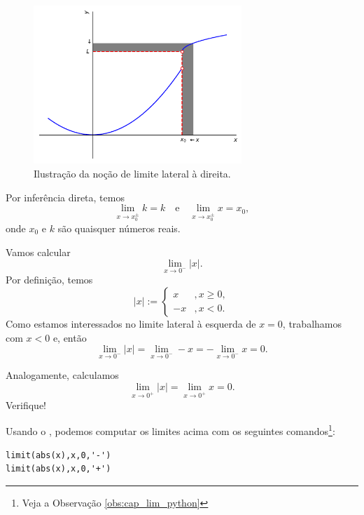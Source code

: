 \begin{figure}[H]
  \centering
  \includegraphics[width=0.7\textwidth]{./cap_lim/dados/fig_lim_dir/fig_lim_dir}
  \caption{Ilustração da noção de limite lateral à direita.}
  \label{fig:lim_dir}
\end{figure}

\begin{obs}
  Por inferência direta, temos
  \begin{equation}
    \lim_{x\to x_0^{\pm}} k = k\quad\text{e}\quad\lim_{x\to x_0^{\pm}} x = x_0,
  \end{equation}
  onde $x_0$ e $k$ são quaisquer números reais.
\end{obs}

\begin{exer}\label{ex:lim_absx}
  Vamos calcular
  \begin{equation}
    \lim_{x\to 0^-} |x|.
  \end{equation}
  Por definição, temos
  \begin{equation}
    |x| := \left\{
      \begin{array}{ll}
        x &, x\geq 0,\\
        -x &, x< 0.
      \end{array}
    \right.
  \end{equation}
  Como estamos interessados no limite lateral à esquerda de $x=0$, trabalhamos com $x<0$ e, então
  \begin{equation}
    \lim_{x\to 0^-} |x| = \lim_{x\to 0^-} -x = -\lim_{x\to 0^-} x = 0.
  \end{equation}
  
  Analogamente, calculamos
  \begin{equation}
    \lim_{x\to 0^+} |x| = \lim_{x\to 0^+} x = 0.
  \end{equation}
  Verifique!

  \ifispython
  Usando o \sympy, podemos computar os limites acima com os seguintes comandos\footnote{Veja a Observação \ref{obs:cap_lim_python}}:
\begin{verbatim}
limit(abs(x),x,0,'-')
limit(abs(x),x,0,'+')
\end{verbatim}
  \fi
\end{exer}

